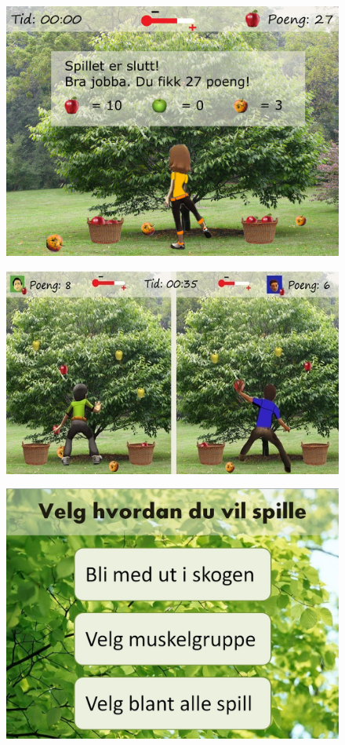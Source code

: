 \begin{figure} [H]
\centering
\includegraphics[scale=0.1]{appletreeend.jpg}
\label{fig:appleOverNorsk}
\end{figure}

\begin{figure} [H]
\centering
\includegraphics[scale=0.8]{multiplayereple.jpg}
\label{fig:appleMultiplayerNorsk}
\end{figure}

\begin{figure} [H]
\centering
\includegraphics[scale=0.45]{menuStart.jpg}
\label{fig:menuStartNorsk}
\end{figure} 

